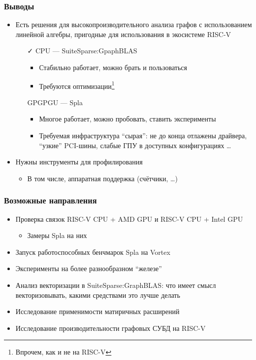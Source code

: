 \documentclass[xcolor=table,aspectratio=169]{beamer}
\begin{document}
\begin{frame}[fragile]
  \frametitle{Выводы}
  \begin{itemize}
    \item Есть решения для высокопроизводительного анализа графов с использованием линейной алгебры, пригодные для использования в экосистеме RISC-V 
    \begin{itemize}
      \item[\faCheck] CPU --- SuiteSparse:GpaphBLAS
        \begin{itemize}
          \item Стабильно работает, можно брать и пользоваться
          \item Требуются оптимизации\footnote{Впрочем, как и не на RISC-V}
        \end{itemize}
      \item[\faGears] GPGPGU --- Spla
      \begin{itemize}
          \item Многое работает, можно пробовать, ставить эксперименты
          \item Требуемая инфраструктура ``сырая'': не до конца отлажены драйвера, ``узкие'' PCI-шины, слабые ГПУ в доступных конфигурациях \ldots
      \end{itemize}
    \end{itemize}
    \item Нужны инструменты для профилирования
    \begin{itemize}
      \item В том числе, аппаратная поддержка (счётчики, \ldots)      
    \end{itemize}
  \end{itemize}
\end{frame}

\begin{frame}[fragile]
  \frametitle{Возможные направления}
  \begin{itemize}
    \item Проверка связок RISC-V CPU + AMD GPU и RISC-V CPU + Intel GPU
    \begin{itemize}
      \item Замеры Spla на них
    \end{itemize}
    \item Запуск работоспособных бенчмарок Spla на Vortex
    \item Эксперименты на более разнообразном ``железе''
    \item Анализ векторизации в SuiteSparse:GraphBLAS: что имеет смысл векторизовывать, какими средствами это лучше делать
    \item Исследование применимости матиричных расширений    
    \item Исследование производительности графовых СУБД на RISC-V
  \end{itemize}
\end{frame}
\end{document}
